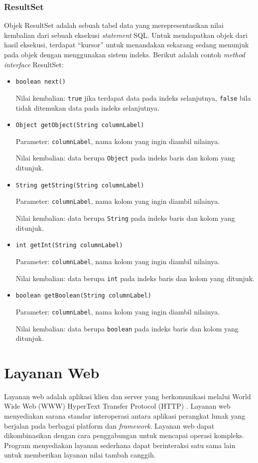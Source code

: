 \subsubsection{ResultSet}
Objek ResultSet adalah sebuah tabel data yang merepresentasikan nilai kembalian dari sebuah eksekusi \textit{statement} SQL. Untuk mendapatkan objek dari hasil eksekusi, terdapat ``kursor'' untuk menandakan sekarang sedang menunjuk pada objek  dengan menggunakan sistem indeks. Berikut adalah contoh \textit{method} \textit{interface} ResultSet:
\begin{itemize}
	\item \texttt{boolean next()}
	
	Nilai kembalian: \texttt{true} jika terdapat data pada indeks selanjutnya, \texttt{false} bila tidak ditemukan data pada indeks selanjutnya.

	\item \texttt{Object getObject(String columnLabel)}
	
	Parameter: \texttt{columnLabel}, nama kolom yang ingin diambil nilainya.
	
	Nilai kembalian: data berupa \texttt{Object} pada indeks baris dan kolom yang ditunjuk.
	
	\item \texttt{String getString(String columnLabel)}
	
	Parameter: \texttt{columnLabel}, nama kolom yang ingin diambil nilainya.
	
	Nilai kembalian: data berupa \texttt{String} pada indeks baris dan kolom yang ditunjuk.
	
	\item \texttt{int getInt(String columnLabel)}
	
	Parameter: \texttt{columnLabel}, nama kolom yang ingin diambil nilainya.
	
	Nilai kembalian: data berupa \texttt{int} pada indeks baris dan kolom yang ditunjuk.
	
	\item \texttt{boolean getBoolean(String columnLabel)}
	
	Parameter: \texttt{columnLabel}, nama kolom yang ingin diambil nilainya.
	
	Nilai kembalian: data berupa \texttt{boolean} pada indeks baris dan kolom yang ditunjuk.
\end{itemize}

\section{Layanan Web}
\label{sec:layananweb}
Layanan web adalah aplikasi klien dan server yang berkomunikasi melalui World Wide Web (WWW) HyperText Transfer Protocol (HTTP) \cite{ws}. Layanan web menyediakan sarana standar interoperasi antara aplikasi perangkat lunak yang berjalan pada berbagai platform dan \textit{framework}. Layanan web dapat dikombinasikan dengan cara penggabungan untuk mencapai operasi kompleks. Program menyediakan layanan sederhana dapat berinteraksi satu sama lain untuk memberikan layanan nilai tambah canggih.

